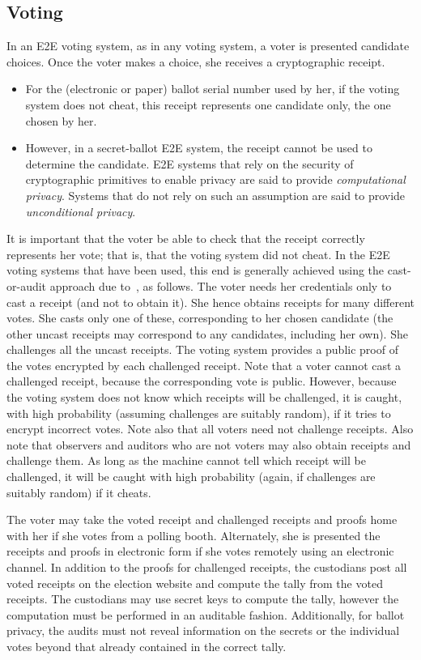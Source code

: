 \subsection{Voting}

In an E2E voting system, as in any voting system, a voter is presented
candidate choices. Once the voter makes a choice, she receives a
cryptographic receipt.
\begin{itemize}
  \item For the (electronic or paper) ballot serial number used by her, if
    the voting system does not cheat, this receipt represents one candidate
    only, the one chosen by her.
  \item However, in a secret-ballot E2E system, the receipt cannot be used
    to determine the candidate. E2E systems that rely on the security of
    cryptographic primitives to enable privacy are said to provide
    \emph{computational privacy}. Systems that do not rely on such an
    assumption are said to provide \emph{unconditional privacy}.
\end{itemize}

It is important that the voter be able to check that the receipt correctly
represents her vote; that is, that the voting system did not cheat. In the
E2E voting systems that have been used, this end is generally achieved using
the cast-or-audit approach due to~\cite{benaloh2006}, as follows. The voter
needs her credentials only to cast a receipt (and not to obtain it). She
hence obtains receipts for many different votes. She casts only one of
these, corresponding to her chosen candidate (the other uncast receipts may
correspond to any candidates, including her own). She challenges all the
uncast receipts. The voting system provides a public proof of the votes
encrypted by each challenged receipt. Note that a voter cannot cast a
challenged receipt, because the corresponding vote is public. However,
because the voting system does not know which receipts will be challenged,
it is caught, with high probability (assuming challenges are suitably
random), if it tries to encrypt incorrect votes. Note also that all voters
need not challenge receipts. Also note that observers and auditors who are
not voters may also obtain receipts and challenge them. As long as the
machine cannot tell which receipt will be challenged, it will be caught with
high probability (again, if challenges are suitably random) if it cheats.

The voter may take the voted receipt and challenged receipts and proofs home
with her if she votes from a polling booth. Alternately, she is presented
the receipts and proofs in electronic form if she votes remotely using an
electronic channel. In addition to the proofs for challenged receipts, the
custodians post all voted receipts on the election website and compute the
tally from the voted receipts. The custodians may use secret keys to compute
the tally, however the computation must be performed in an auditable
fashion. Additionally, for ballot privacy, the audits must not reveal
information on the secrets or the individual votes beyond that already
contained in the correct tally.

